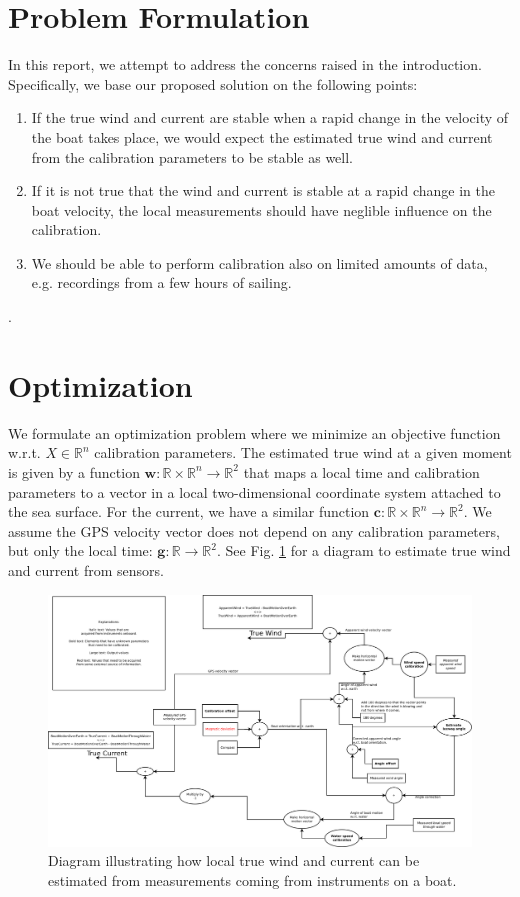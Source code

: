 \documentclass{article}
\newcommand{\realvec}[1]{\mathbf{#1}}
\newcommand{\realnumber}{\mathbb{R}}
\begin{document}
\section{Problem Formulation}
In this report, we attempt to address the concerns raised in the introduction. Specifically, we base our proposed solution on the following points:
\begin{enumerate}
 \item If the true wind and current are stable when a rapid change in the velocity of the boat takes place, we would expect the estimated true wind and current from the calibration parameters to be stable as well.
 \item If it is not true that the wind and current is stable at a rapid change in the boat velocity, the local measurements should have neglible influence on the calibration.
 \item We should be able to perform calibration also on limited amounts of data, e.g. recordings from a few hours of sailing.
\end{enumerate}.

\section{Optimization}
We formulate an optimization problem where we minimize an objective function w.r.t. $X \in \realnumber^n$ calibration parameters. The estimated true wind at a given moment is given by a function $\realvec{w}: \realnumber \times \realnumber^n \rightarrow \realnumber^2$ that maps a local time and calibration parameters to a vector in a local two-dimensional coordinate system attached to the sea surface. For the current, we have a similar function $\realvec{c}: \realnumber \times \realnumber^n \rightarrow \realnumber^2$. We assume the GPS velocity vector does not depend on any calibration parameters, but only the local time: $\realvec{g}: \realnumber \rightarrow \realnumber^2$. See Fig. \ref{fig:calib} for a diagram to estimate true wind and current from sensors.
\begin{figure}
\centering
\includegraphics[width=\textwidth]{simplecalib.pdf}
\caption{Diagram illustrating how local true wind and current can be estimated from measurements coming from instruments on a boat.}
\label{fig:calib}
\end{figure}
\end{document}
